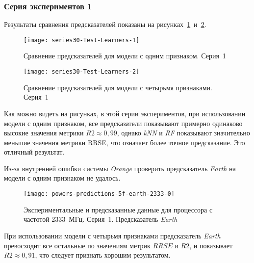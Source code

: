 \subsubsection{Серия экспериментов 1}

Результаты сравнения предсказателей показаны на рисунках~\ref{img:series30-Test-Learners-1}~и~\ref{img:series30-Test-Learners-2}.

\begin{figure}
    \begin{center}
            \texttt{[image: series30-Test-Learners-1]}
            \caption{Сравнение предсказателей для модели с одним признаком. Серия~1} %
            \label{img:series30-Test-Learners-1} %
    \end{center}
\end{figure}

\begin{figure}
    \begin{center}
            \texttt{[image: series30-Test-Learners-2]}
            \caption{Сравнение предсказателей для модели с четырьмя признаками. Серия~1}
            \label{img:series30-Test-Learners-2}
    \end{center}
\end{figure}

Как можно видеть на рисунках, в этой серии экспериментов, при использовании модели с одним признаком, все предсказатели показывают примерно одинаково высокие значения метрики $R2 \approx 0,99$, однако \textit{kNN} и \textit{RF} показывают значительно меньшие значения метрики RRSE, что означает более точное предсказание. Это отличный результат.

Из-за внутренней ошибки системы \textit{Orange} проверить предсказатель \textit{Earth} на модели с одним признаком не удалось.

\begin{figure}
    \begin{center}
        \texttt{[image: powers-predictions-5f-earth-2333-0]}
        \caption{Экспериментальные и предсказанные данные для процессора с частотой 2333~МГц. Серия~1. Предсказатель \textit{Earth}}
        \label{img:powers-predictions-5f-earth-2333-0}
    \end{center}
\end{figure}

При использовании модели с четырьмя признаками предсказатель \textit{Earth} превосходит все остальные по значениям метрик $RRSE$ и $R2$, и показывает $R2 \approx 0,91$, что следует признать хорошим результатом.

